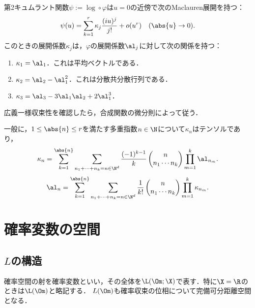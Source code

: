 \documentclass[uplatex,dvipdfmx]{jsreport}
\begin{document}
\begin{theorem}
    第2キュムラント関数$\psi:=\log\circ\varphi$は$u=0$の近傍で次のMaclauren展開を持つ：
    \[\psi(u)=\sum^r_{k=1}\kappa_j\frac{(iu)^j}{j!}+o(u^r)\quad(\abs{u}\to0).\]
    このときの展開係数$\kappa_j$は，$\varphi$の展開係数$\al_j$に対して次の関係を持つ：
    \begin{enumerate}
        \item $\kappa_1=\al_1$．これは平均ベクトルである．
        \item $\kappa_2=\al_2-\al_1^2$．これは分散共分散行列である．
        \item $\kappa_3=\al_3-3\al_1\al_2+2\al_1^3$．
    \end{enumerate}
\end{theorem}
\begin{Proof}
    広義一様収束性を確認したら，合成関数の微分則によって従う．
\end{Proof}

\begin{proposition}
    一般に，$1\le\abs{n}\le r$を満たす多重指数$n\in\N$について$\kappa_n$はテンソルであり，
    \[\kappa_n=\sum_{k=1}^{\abs{n}}\sum_{n_1+\cdots+n_k=n\in\N^d}\frac{(-1)^{k-1}}{k}\begin{pmatrix}n\\n_1\cdots n_k\end{pmatrix}\prod^k_{m=1}\al_{n_m}.\]
    \[\al_n=\sum_{k=1}^{\abs{n}}\sum_{n_1+\cdots+n_k=n\in\N^d}\frac{1}{k!}\begin{pmatrix}n\\n_1\cdots n_k\end{pmatrix}\prod^k_{m=1}\kappa_{n_m}.\]
\end{proposition}

\section{確率変数の空間}

\subsection{$L$の構造}

\begin{tcolorbox}[colframe=ForestGreen, colback=ForestGreen!10!white,breakable,colbacktitle=ForestGreen!40!white,coltitle=black,fonttitle=\bfseries\sffamily,
title=]
    確率空間の射を確率変数といい，その全体を$\L(\Om;\X)$で表す．特に$\X=\R$のときは$\L(\Om)$と略記する．
    $L(\Om)$も確率収束の位相について完備可分距離空間となる．
\end{tcolorbox}
\end{document}
